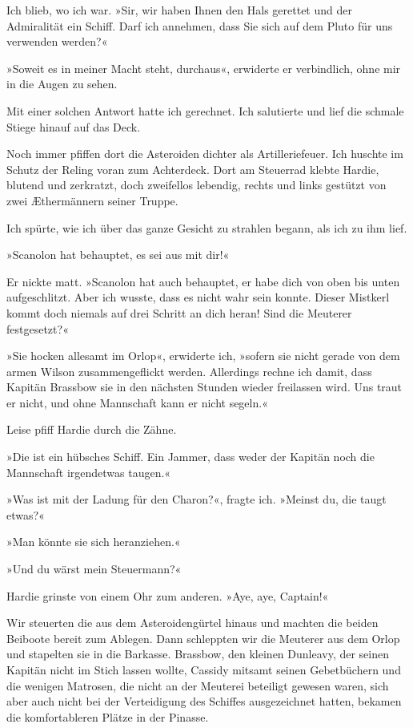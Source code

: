 Ich blieb, wo ich war. »Sir, wir haben Ihnen den Hals gerettet und
der Admiralität ein Schiff. Darf ich annehmen, dass Sie sich auf
dem Pluto für uns verwenden werden?«

»Soweit es in meiner Macht steht, durchaus«, erwiderte er
verbindlich, ohne mir in die Augen zu sehen.

Mit einer solchen Antwort hatte ich gerechnet. Ich salutierte und
lief die schmale Stiege hinauf auf das Deck.

\bigpar

Noch immer pfiffen dort die Asteroiden dichter als Artilleriefeuer.
Ich huschte im Schutz der Reling voran zum Achterdeck. Dort am
Steuerrad klebte Hardie, blutend und zerkratzt, doch zweifellos
lebendig, rechts und links gestützt von zwei Æthermännern seiner
Truppe.

Ich spürte, wie ich über das ganze Gesicht zu strahlen begann, als
ich zu ihm lief.

»Scanolon hat behauptet, es sei aus mit dir!«

Er nickte matt. »Scanolon hat auch behauptet, er habe dich von oben
bis unten aufgeschlitzt. Aber ich wusste, dass es nicht wahr sein
konnte. Dieser Mistkerl kommt doch niemals auf drei Schritt an dich
heran! Sind die Meuterer festgesetzt?«

»Sie hocken allesamt im Orlop«, erwiderte ich, »sofern sie nicht
gerade von dem armen Wilson zusammengeflickt werden. Allerdings
rechne ich damit, dass Kapitän Brassbow sie in den nächsten Stunden
wieder freilassen wird. Uns traut er nicht, und ohne Mannschaft
kann er nicht segeln.«

Leise pfiff Hardie durch die Zähne.

»Die  ist ein hübsches Schiff. Ein Jammer, dass
weder der Kapitän noch die Mannschaft irgendetwas taugen.«

»Was ist mit der Ladung für den Charon?«, fragte ich. »Meinst du,
die taugt etwas?«

»Man könnte sie sich heranziehen.«

»Und du wärst mein Steuermann?«

Hardie grinste von einem Ohr zum anderen. »Aye, aye, Captain!«

\bigpar

Wir steuerten die  aus dem Asteroidengürtel hinaus
und machten die beiden Beiboote bereit zum Ablegen. Dann schleppten
wir die Meuterer aus dem Orlop und stapelten sie in die Barkasse.
Brassbow, den kleinen Dunleavy, der seinen Kapitän nicht im Stich
lassen wollte, Cassidy mitsamt seinen Gebetbüchern und die wenigen
Matrosen, die nicht an der Meuterei beteiligt gewesen waren, sich
aber auch nicht bei der Verteidigung des Schiffes ausgezeichnet
hatten, bekamen die komfortableren Plätze in der Pinasse.


